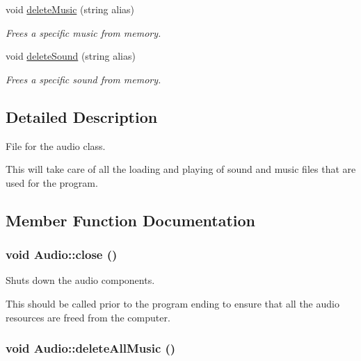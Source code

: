 \begin{CompactItemize}
void \hyperlink{class_audio_45c7697fe1e5d1fc2f021121718baf76}{deleteMusic} (string alias)
\begin{CompactList}\small\item\em Frees a specific music from memory. \item\end{CompactList}\item 
void \hyperlink{class_audio_5ae8b89e7f43bd9122be714aedece488}{deleteSound} (string alias)
\begin{CompactList}\small\item\em Frees a specific sound from memory. \item\end{CompactList}\end{CompactItemize}


\subsection{Detailed Description}
File for the audio class. 

This will take care of all the loading and playing of sound and music files that are used for the program. 

\subsection{Member Function Documentation}
\hypertarget{class_audio_8104ba39add67a27e07d16693e5b1569}{
\subsubsection[{close}]{\setlength{\rightskip}{0pt plus 5cm}void Audio::close ()}}
\label{class_audio_8104ba39add67a27e07d16693e5b1569}


Shuts down the audio components. 

This should be called prior to the program ending to ensure that all the audio resources are freed from the computer. \hypertarget{class_audio_b5337dc70b4652d2065af503da72ca4f}{
\subsubsection[{deleteAllMusic}]{\setlength{\rightskip}{0pt plus 5cm}void Audio::deleteAllMusic ()}}
\label{class_audio_b5337dc70b4652d2065af503da72ca4f}


